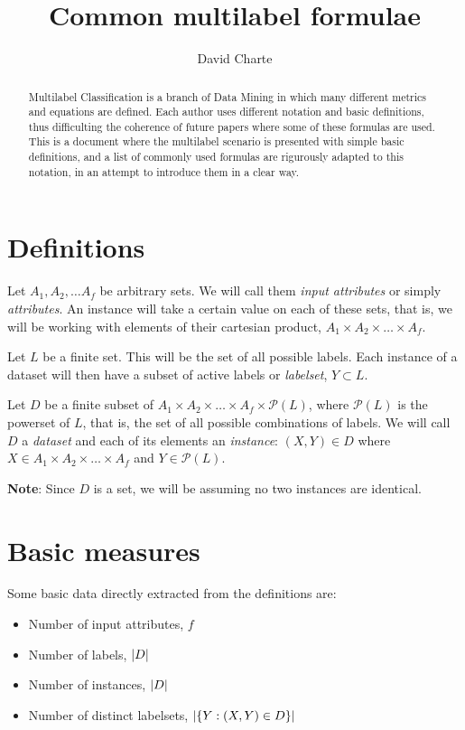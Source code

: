 \documentclass[]{article}
\title{Common multilabel formulae\\\vspace{0.5em}{\large \ldots{}under a common notation}}
\author{David Charte}
\date{}
\begin{document}
\maketitle
\begin{abstract}
Multilabel Classification is a branch of Data Mining in which many
different metrics and equations are defined. Each author uses different
notation and basic definitions, thus difficulting the coherence of
future papers where some of these formulas are used. This is a document
where the multilabel scenario is presented with simple basic
definitions, and a list of commonly used formulas are rigurously adapted
to this notation, in an attempt to introduce them in a clear way.
\end{abstract}

\section{Definitions}\label{definitions}

Let \(A_1, A_2, \dots A_f\) be arbitrary sets. We will call them
\emph{input attributes} or simply \emph{attributes}. An instance will
take a certain value on each of these sets, that is, we will be working
with elements of their cartesian product,
\(A_1\times A_2\times\dots\times A_f\).

Let \(L\) be a finite set. This will be the set of all possible labels.
Each instance of a dataset will then have a subset of active labels or
\emph{labelset}, \(Y \subset L\).

Let \(D\) be a finite subset of
\(A_1\times A_2\times\dots\times A_f\times\mathcal{P}(L)\), where
\(\mathcal{P}(L)\) is the powerset of \(L\), that is, the set of all
possible combinations of labels. We will call \(D\) a \emph{dataset} and
each of its elements an \emph{instance}: \((X, Y)\in D\) where
\(X\in A_1\times A_2\times\dots\times A_f\) and \(Y \in\mathcal{P}(L)\).

\textbf{Note}: Since \(D\) is a set, we will be assuming no two
instances are identical.

\section{Basic measures}\label{basic-measures}

Some basic data directly extracted from the definitions are:

\begin{itemize}
\itemsep1pt\parskip0pt
\item
  Number of input attributes, \(f\)
\item
  Number of labels, \(\left\lvert{D}\right\rvert\)
\item
  Number of instances, \(\left\lvert{D}\right\rvert\)
\item
  Number of distinct labelsets, \(\left\lvert{\{Y:(X, Y)\in D\}}\right\rvert\)
\end{itemize}
\end{document}
